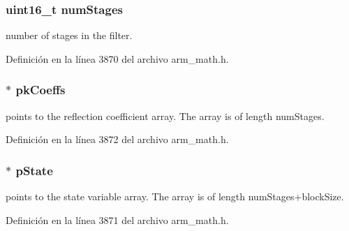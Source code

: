 \subsubsection[{\texorpdfstring{num\+Stages}{numStages}}]{\setlength{\rightskip}{0pt plus 5cm}uint16\+\_\+t num\+Stages}\hypertarget{structarm__iir__lattice__instance__q31_a4cceb90547b3e585d4c7aabaa8057212}{}\label{structarm__iir__lattice__instance__q31_a4cceb90547b3e585d4c7aabaa8057212}
number of stages in the filter. 

Definición en la línea 3870 del archivo arm\+\_\+math.\+h.

\subsubsection[{\texorpdfstring{pk\+Coeffs}{pkCoeffs}}]{$\ast$ pk\+Coeffs}\hypertarget{structarm__iir__lattice__instance__q31_a9d45339bf841bf86aec57be5f70d2b01}{}\label{structarm__iir__lattice__instance__q31_a9d45339bf841bf86aec57be5f70d2b01}
points to the reflection coefficient array. The array is of length num\+Stages. 

Definición en la línea 3872 del archivo arm\+\_\+math.\+h.

\subsubsection[{\texorpdfstring{p\+State}{pState}}]{$\ast$ p\+State}\hypertarget{structarm__iir__lattice__instance__q31_adee4ba3ee8869865af7d8fa08ca913d6}{}\label{structarm__iir__lattice__instance__q31_adee4ba3ee8869865af7d8fa08ca913d6}
points to the state variable array. The array is of length num\+Stages+block\+Size. 

Definición en la línea 3871 del archivo arm\+\_\+math.\+h.

